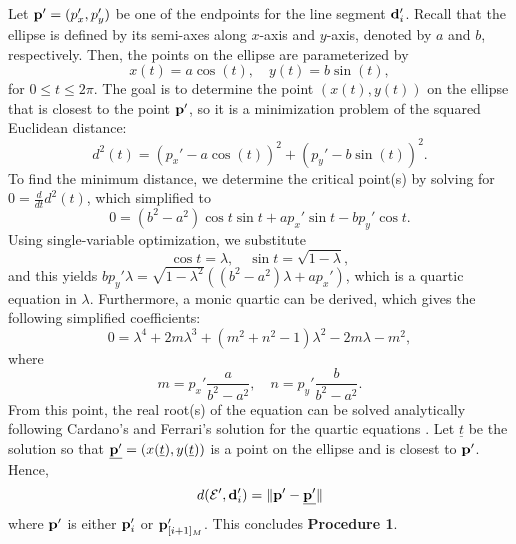\begin{method}
Let $\mathbf{p}' = (p_x', p_y')$ be one of the endpoints for the line segment $\mathbf{d}_i'$. Recall that the ellipse is defined by its semi-axes along $x$-axis and $y$-axis, denoted by $a$ and $b$, respectively. Then, the points on the ellipse are parameterized by 
\begin{equation}
x(t) = a\cos(t), \quad y(t) = b\sin(t),
\end{equation}
for $0 \leq t \leq 2 \pi$. The goal is to determine the point $(x(t), y(t))$ on the ellipse that is closest to the point $\mathbf{p}'$, so it is a minimization problem of the squared Euclidean distance:
%
\begin{equation}
d^2(t) = (p_x' - a\cos(t))^2 + (p_y' - b\sin(t))^2.
\end{equation}
%
To find the minimum distance, we determine the critical point(s) by solving for $0 = \frac{d}{dt} d^2(t)$, which simplified to
%
\begin{equation}
0 = (b^2 - a^2)\cos t \sin t  + a p_x' \sin t - b p_y' \cos t.
\end{equation}
%
Using single-variable optimization, we substitute 
\begin{equation}
    \cos t = \lambda, \quad \sin t = \sqrt{1-\lambda},
\end{equation}
%
and this yields $b p_y' \lambda = \sqrt{1-\lambda^2}((b^2-a^2)\lambda+a p_x')$, which is a quartic equation in $\lambda$. Furthermore, a monic quartic can be derived, which gives the following simplified coefficients:
\begin{equation}
    0 = \lambda^4 + 2m\lambda^3 + (m^2 + n^2 -1) \lambda^2 -2m \lambda -m^2,
\end{equation}
where
%
\begin{equation}
    m = p_x' \frac{a}{b^2 - a^2}, \quad n = p_y' \frac{b}{b^2 - a^2}.
\end{equation}
%
From this point, the real root(s) of the equation can be solved analytically following Cardano's and Ferrari's solution for the quartic equations \cite{cardano2011artis}. 
Let $\underline{t}$ be the solution so that $\underline{\mathbf{p}'} = (x(\underline{t}),y(\underline{t}))$ is a point on the ellipse and is closest to $\mathbf{p}'$. Hence, 
\begin{equation}
\label{eq: ellipse_to_point}
    d({\cal E}', \mathbf{d}_i') = \| \mathbf{p}' - \underline{\mathbf{p}'} \|
\end{equation}
where $\mathbf{p}'$ is either $\mathbf{p}_i'$ or $\mathbf{p}_{[i+1]_{M}}'$. This concludes \textbf{Procedure 1}.
\end{method}


